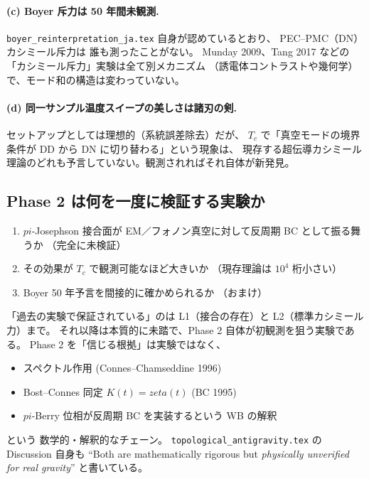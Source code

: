 \documentclass[11pt,a4paper]{article}
\def\pi{pi}%
\def\zeta{zeta}%
\def\textbf#1{#1}%
\begin{document}
\paragraph{(c) Boyer 斥力は 50 年間未観測.}
\texttt{boyer\_reinterpretation\_ja.tex} 自身が認めているとおり、
PEC--PMC（DN）カシミール斥力は \textbf{誰も測ったことがない}。
Munday 2009、Tang 2017 などの「カシミール斥力」実験は全て別メカニズム
（誘電体コントラストや幾何学）で、モード和の構造は変わっていない。

\paragraph{(d) 同一サンプル温度スイープの美しさは諸刃の剣.}
セットアップとしては理想的（系統誤差除去）だが、
$T_c$ で「真空モードの境界条件が DD から DN に切り替わる」という現象は、
現存する超伝導カシミール理論のどれも予言していない。観測されればそれ自体が新発見。

\subsection{Phase 2 は何を一度に検証する実験か}

\begin{enumerate}
\item $\pi$-Josephson 接合面が EM／フォノン真空に対して反周期 BC として振る舞うか
  （\textbf{完全に未検証}）
\item その効果が $T_c$ で観測可能なほど大きいか
  （\textbf{現存理論は $10^4$ 桁小さい}）
\item Boyer 50 年予言を間接的に確かめられるか
  （\textbf{おまけ}）
\end{enumerate}

「過去の実験で保証されている」のは L1（接合の存在）と L2（標準カシミール力）まで。
それ以降は本質的に未踏で、Phase 2 自体が初観測を狙う実験である。
Phase 2 を「信じる根拠」は実験ではなく、

\begin{itemize}
\item スペクトル作用 (Connes--Chamseddine 1996)
\item Bost--Connes 同定 $K(t)=\zeta(t)$ (BC 1995)
\item $\pi$-Berry 位相が反周期 BC を実装するという WB の解釈
\end{itemize}

という \textbf{数学的・解釈的なチェーン}。
\texttt{topological\_antigravity.tex} の Discussion 自身も
``Both are mathematically rigorous but \emph{physically unverified for real gravity}''
と書いている。
\end{document}
